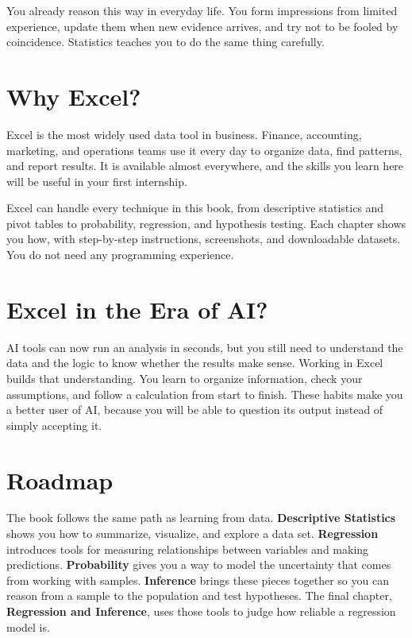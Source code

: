 \documentclass[
  11pt,
  letterpaper,
  DIV=11,
  numbers=noendperiod,
  oneside,
  open=any]{scrreprt}
\begin{document}
You already reason this way in everyday life. You form impressions from
limited experience, update them when new evidence arrives, and try not
to be fooled by coincidence. Statistics teaches you to do the same thing
carefully.

\section*{Why Excel?}\label{why-excel}


Excel is the most widely used data tool in business. Finance,
accounting, marketing, and operations teams use it every day to organize
data, find patterns, and report results. It is available almost
everywhere, and the skills you learn here will be useful in your first
internship.

Excel can handle every technique in this book, from descriptive
statistics and pivot tables to probability, regression, and hypothesis
testing. Each chapter shows you how, with step-by-step instructions,
screenshots, and downloadable datasets. You do not need any programming
experience.

\section*{Excel in the Era of AI?}\label{excel-in-the-era-of-ai}


AI tools can now run an analysis in seconds, but you still need to
understand the data and the logic to know whether the results make
sense. Working in Excel builds that understanding. You learn to organize
information, check your assumptions, and follow a calculation from start
to finish. These habits make you a better user of AI, because you will
be able to question its output instead of simply accepting it.

\section*{Roadmap}\label{roadmap}


The book follows the same path as learning from data.
\textbf{Descriptive Statistics} shows you how to summarize, visualize,
and explore a data set. \textbf{Regression} introduces tools for
measuring relationships between variables and making predictions.
\textbf{Probability} gives you a way to model the uncertainty that comes
from working with samples. \textbf{Inference} brings these pieces
together so you can reason from a sample to the population and test
hypotheses. The final chapter, \textbf{Regression and Inference}, uses
those tools to judge how reliable a regression model is.
\end{document}
